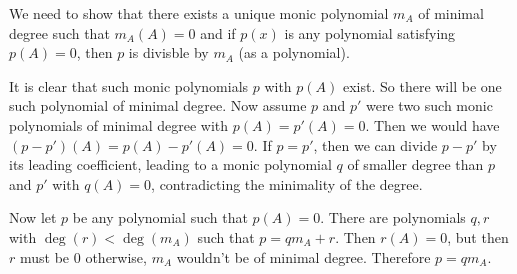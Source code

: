 
We need to show that there exists a unique monic polynomial $m_A$ of minimal degree such that $m_A(A)=0$ and if $p(x)$ is any polynomial satisfying $p(A)=0$, then $p$ is divisble by $m_A$ (as a polynomial).

It is clear that such monic polynomials $p$ with $p(A)$ exist. So there will be one such polynomial of minimal degree. Now assume $p$ and $p'$ were two such monic polynomials of minimal degree with $p(A)=p'(A)=0$. Then we would have $(p-p')(A)=p(A)-p'(A)=0$. If $p=p'$, then we can divide $p-p'$ by its leading coefficient, leading to a monic polynomial $q$ of smaller degree than $p$ and $p'$ with $q(A)=0$, contradicting the minimality of the degree. 

Now let $p$ be any polynomial such that $p(A)=0$. There are polynomials $q,r$ with $\deg(r)<\deg(m_A)$ such that $p=qm_A+r$. Then $r(A)=0$, but then $r$ must be $0$ otherwise, $m_A$ wouldn't be of minimal degree. Therefore $p=qm_A$.